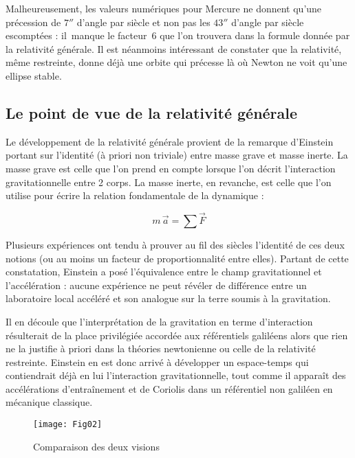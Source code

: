 \documentclass[12pt,a4paper]{article}
\begin{document}
Malheureusement, les valeurs numériques pour Mercure ne donnent qu'une
précession de $7''$ d'angle par siècle et non pas les $43''$ d'angle par
siècle escomptées : il~manque le facteur~6 que l'on trouvera dans la
formule donnée par la relativité générale. Il est néanmoins
intéressant de constater que la relativité, même restreinte, donne
déjà une orbite qui précesse là où Newton ne voit qu'une ellipse
stable.

\subsection{Le point de vue de la relativité générale}

Le développement de la relativité générale provient de la remarque
d'Einstein portant sur l'identité (à priori non triviale) entre masse
grave et masse inerte. La masse grave est celle que l'on prend en compte
lorsque l'on décrit l'interaction gravitationnelle entre 2 corps. La
masse inerte, en revanche, est celle que l'on utilise pour écrire la
relation fondamentale de la dynamique :
    
\begin{equation}
    m\, \vec{a} = \sum \vec{F}
\end{equation}

    Plusieurs expériences ont tendu à prouver au fil des siècles
l'identité de ces deux notions (ou au moins un facteur de
proportionnalité entre elles). Partant de cette constatation, Einstein a
posé l'équivalence entre le champ gravitationnel et l'accélération
: aucune expérience ne peut révéler de différence entre un
laboratoire local accéléré et son analogue sur la terre soumis à
la gravitation.

Il en découle que l'interprétation de la gravitation en terme
d'interaction résulterait de la place privilégiée accordée aux
référentiels galiléens alors que rien ne la justifie à priori dans
la théories newtonienne ou celle de la relativité restreinte. Einstein
en est donc arrivé à développer un espace-temps qui contiendrait
déjà en lui l'interaction gravitationnelle, tout comme il apparaît des
accélérations d'entraînement et de Coriolis dans un référentiel
non galiléen en mécanique classique.

\begin{figure}[ht]

 \begin{center}
\texttt{[image: Fig02]}
\caption{Comparaison des deux visions}
      
\end{center}
\end{figure}
\end{document}
